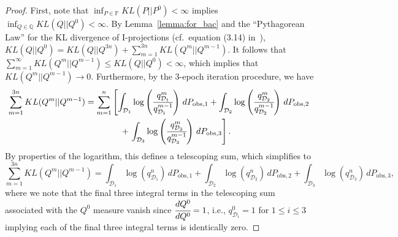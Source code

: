 \documentclass{article}
\newcommand{\p}{\mathbb{P}}
\newcommand{\q}{\mathbb{Q}}
\begin{document}
\begin{proof}
First, note that $\inf_{P \in \p} KL(P || P^{0}) < \infty$ implies $\inf_{Q \in \q} KL(Q || Q^{0}) < \infty$.
By Lemma~\ref{lemma:for_bac} and the ``Pythagorean Law'' for the KL divergence of I-projections (cf.~equation (3.14) in~\cite{Csiszar1975}), $KL(Q || Q^{0}) = KL(Q || Q^{3n}) + \sum_{m=1}^{3n}KL(Q^{m} || Q^{m-1})$.
It follows that $\sum_{m=1}^{\infty}KL(Q^{m} || Q^{m-1})\leq KL(Q||Q^0) <\infty$, which implies that $KL(Q^m || Q^{m-1})\to 0$. 
Furthermore, by the 3-epoch iteration procedure, we have
\begin{align*}
     \sum_{m=1}^{3n}  KL(Q^{m} || Q^{m-1}) = \sum_{m=1}^n & \left[ \int_{\mathcal{D}_{1}} \log \left(\cfrac{q_{\mathcal{D}_{1}}^{m}}{q_{\mathcal{D}_{1}}^{m-1}}\right)\, dP_{\text{obs},1} + \int_{\mathcal{D}_{2}}\log\left(\cfrac{q_{\mathcal{D}_{2}}^{m}}{q_{\mathcal{D}_{2}}^{m-1}}\right)\, dP_{\text{obs,2}} \right. \\
     & \quad + \left.\int_{\mathcal{D}_{3}}\log\left(\cfrac{q_{\mathcal{D}_{3}}^{m}}{q_{\mathcal{D}_{3}}^{m-1}}\right)\, dP_{\text{obs},3}\right].
\end{align*}
By properties of the logarithm, this defines a telescoping sum, which simplifies to
\begin{equation*}
     \sum_{m=1}^{3n}  KL(Q^{m} || Q^{m-1})=\int_{\mathcal{D}_{1}}\log(q_{\mathcal{D}_{1}}^{n})\, dP_{\text{obs},1} + \int_{\mathcal{D}_{2}}\log(q_{\mathcal{D}_{2}}^{n})\, dP_{\text{obs},2} + \int_{\mathcal{D}_{3}}\log(q_{\mathcal{D}_{3}}^{n})\, dP_{\text{obs},3},
\end{equation*}
where we note that the final three integral terms in the telescoping sum associated with the $Q^0$ measure vanish since $\cfrac{dQ^{0}}{dQ^{0}}=1$, i.e., $q_{\mathcal{D}_i}^0=1$ for $1\leq i\leq 3$ implying each of the final three integral terms is identically zero. 


\end{proof}
\end{document}
